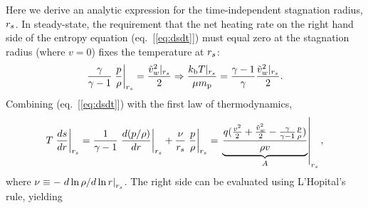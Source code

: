 Here we derive an analytic expression for the time-independent
stagnation radius, $r_s$.  In steady-state, the requirement that the
net heating rate on the right hand side of the entropy equation
(eq.~[\ref{eq:dsdt}]) must equal zero at the stagnation radius (where $v = 0$) fixes the temperature at $r_s$:
\begin{align}
 \frac{\gamma}{\gamma-1} \left.\frac{p}{\rho}\right|_{r_s}=\frac{\tilde{v}_{w}^{2}|_{r_s}}{2} \Rightarrow \frac{k_{\rm b} T|_{r_s}}{\mu m_{\rm p}}=\frac{\gamma-1}{\gamma} \frac{\tilde{v}_{w}^{2}|_{r_s}}{2} .
\label{eq:appTanalytic}
\end{align}
Combining (eq.~[\ref{eq:dsdt}]) with the first law of thermodynamics,
\begin{align}
T\left.\frac{d s}{d r}\right|_{r_s} = \frac{1}{\gamma-1}\left.\frac{d (p/\rho)}{d r}\right|_{r_s}+\frac{\nu}{r_s}  \left.\frac{p}{\rho}\right|_{r_s}=\left.\underbrace{\frac{q (\frac{v^2}{2}+\frac{\tilde{v}_{w}^2}{2}-\frac{\gamma}{\gamma-1} \frac{p}{\rho})}{\rho  v}}_{A}\right|_{r_s}, 
 \label{eq:first_law}
\end{align}
where $\nu\equiv -\left.d\ln\rho/d\ln r\right|_{r_s}$.  The right side can be evaluated using L'Hopital's rule, yielding

